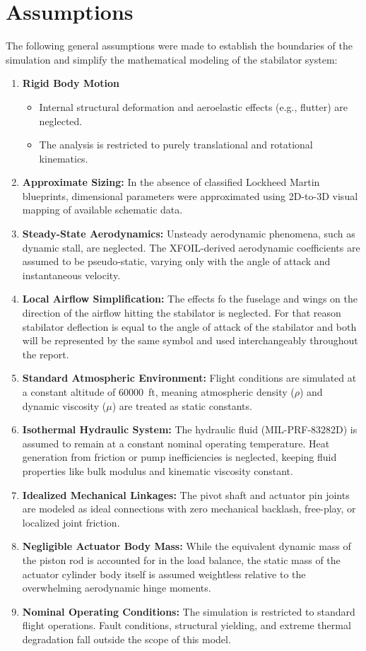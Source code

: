 \documentclass[
bindingoffset=5mm,  %
footnoteindent=3mm, %
hyphenation=true    %
]{src/wut-thesis}
\begin{document}
	\section{Assumptions}
	
	The following general assumptions were made to establish the boundaries of the simulation and simplify the mathematical modeling of the stabilator system:
	
	\begin{enumerate}
		\item \textbf{Rigid Body Motion}
		\begin{itemize}
			\item Internal structural deformation and aeroelastic effects (e.g., flutter) are neglected.
			\item The analysis is restricted to purely translational and rotational kinematics.
		\end{itemize}
		\item \textbf{Approximate Sizing:} In the absence of classified Lockheed Martin blueprints, dimensional parameters were approximated using 2D-to-3D visual mapping of available schematic data.
		\item \textbf{Steady-State Aerodynamics:} Unsteady aerodynamic phenomena, such as dynamic stall, are neglected. The XFOIL-derived aerodynamic coefficients are assumed to be pseudo-static, varying only with the angle of attack and instantaneous velocity.
		\item \textbf{Local Airflow Simplification:} The effects fo the fuselage and wings on the direction of the airflow hitting the stabilator is neglected. For that reason stabilator deflection is equal to the angle of attack of the stabilator and both will be represented by the same symbol and used interchangeably throughout the report.
		\item \textbf{Standard Atmospheric Environment:} Flight conditions are simulated at a constant altitude of \qty{60000}{ft}, meaning atmospheric density ($\rho$) and dynamic viscosity ($\mu$) are treated as static constants.
		\item \textbf{Isothermal Hydraulic System:} The hydraulic fluid (MIL-PRF-83282D) is assumed to remain at a constant nominal operating temperature. Heat generation from friction or pump inefficiencies is neglected, keeping fluid properties like bulk modulus and kinematic viscosity constant.
		\item \textbf{Idealized Mechanical Linkages:} The pivot shaft and actuator pin joints are modeled as ideal connections with zero mechanical backlash, free-play, or localized joint friction.
		\item \textbf{Negligible Actuator Body Mass:} While the equivalent dynamic mass of the piston rod is accounted for in the load balance, the static mass of the actuator cylinder body itself is assumed weightless relative to the overwhelming aerodynamic hinge moments.
		\item \textbf{Nominal Operating Conditions:} The simulation is restricted to standard flight operations. Fault conditions, structural yielding, and extreme thermal degradation fall outside the scope of this model.
	\end{enumerate}
	
\end{document}

